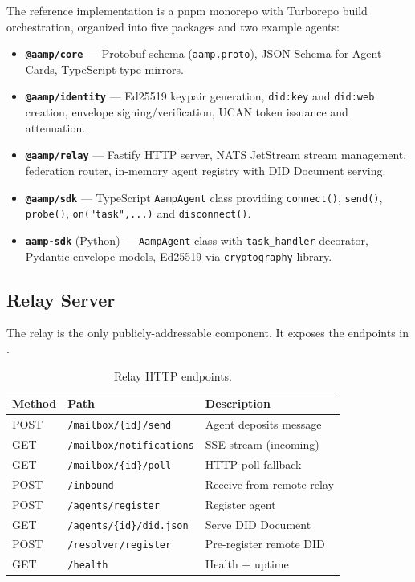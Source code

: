 \documentclass[11pt,a4paper]{article}
\begin{document}
The reference implementation is a pnpm monorepo with Turborepo build orchestration,
organized into five packages and two example agents:

\begin{itemize}[leftmargin=*]
  \item \textbf{\texttt{@aamp/core}} — Protobuf schema (\texttt{aamp.proto}),
    JSON Schema for Agent Cards, TypeScript type mirrors.
  \item \textbf{\texttt{@aamp/identity}} — Ed25519 keypair generation, \texttt{did:key}
    and \texttt{did:web} creation, envelope signing/verification, UCAN token issuance
    and attenuation.
  \item \textbf{\texttt{@aamp/relay}} — Fastify HTTP server, NATS JetStream stream
    management, federation router, in-memory agent registry with DID Document serving.
  \item \textbf{\texttt{@aamp/sdk}} — TypeScript \texttt{AampAgent} class providing
    \texttt{connect()}, \texttt{send()}, \texttt{probe()}, \texttt{on("task",...)}
    and \texttt{disconnect()}.
  \item \textbf{\texttt{aamp-sdk}} (Python) — \texttt{AampAgent} class with
    \texttt{task\_handler} decorator, Pydantic envelope models, Ed25519 via
    \texttt{cryptography} library.
\end{itemize}

\subsection{Relay Server}

The relay is the only publicly-addressable component. It exposes the endpoints in
.

\begin{table}[H]
\centering
\caption{Relay HTTP endpoints.}
\label{tab:endpoints}
\small
\begin{tabular}{lll}
\toprule
\textbf{Method} & \textbf{Path} & \textbf{Description} \\
\midrule
POST  & \texttt{/mailbox/\{id\}/send}      & Agent deposits message \\
GET   & \texttt{/mailbox/notifications}    & SSE stream (incoming) \\
GET   & \texttt{/mailbox/\{id\}/poll}      & HTTP poll fallback \\
POST  & \texttt{/inbound}                  & Receive from remote relay \\
POST  & \texttt{/agents/register}          & Register agent \\
GET   & \texttt{/agents/\{id\}/did.json}   & Serve DID Document \\
POST  & \texttt{/resolver/register}        & Pre-register remote DID \\
GET   & \texttt{/health}                   & Health + uptime \\
\bottomrule
\end{tabular}
\end{table}
\end{document}
